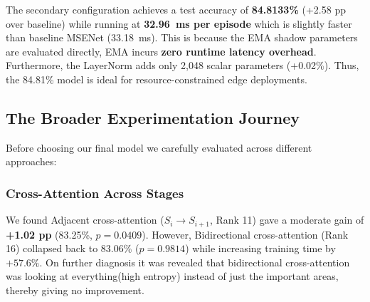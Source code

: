 \documentclass[conference]{IEEEtran}
\begin{document}
\begin{table}[h]
\centering
\caption{Computational Efficiency, Latency, and Memory Comparison.}
\label{tab:efficiency}
\end{table}

The secondary configuration achieves a test accuracy of \textbf{84.8133\%} (+2.58 pp over baseline) while running at \textbf{32.96~ms per episode} which is slightly faster than baseline MSENet (33.18~ms). This is because the EMA shadow parameters are evaluated directly, EMA incurs \textbf{zero runtime latency overhead}. Furthermore, the LayerNorm adds only 2,048 scalar parameters (+0.02\%). Thus, the 84.81\% model is ideal for resource-constrained edge deployments.
\subsection{The Broader Experimentation Journey}
Before choosing our final model we carefully evaluated across different approaches:

\subsubsection{Cross-Attention Across Stages}
We found Adjacent cross-attention ($S_i \to S_{i+1}$, Rank 11) gave a moderate gain of \textbf{+1.02 pp} (83.25\%, $p=0.0409$). However, Bidirectional cross-attention (Rank 16) collapsed back to 83.06\% ($p=0.9814$) while increasing training time by $+57.6\%$. On further diagnosis it was revealed that bidirectional cross-attention was looking at everything(high entropy) instead of just the important areas, thereby giving no improvement.
\end{document}
